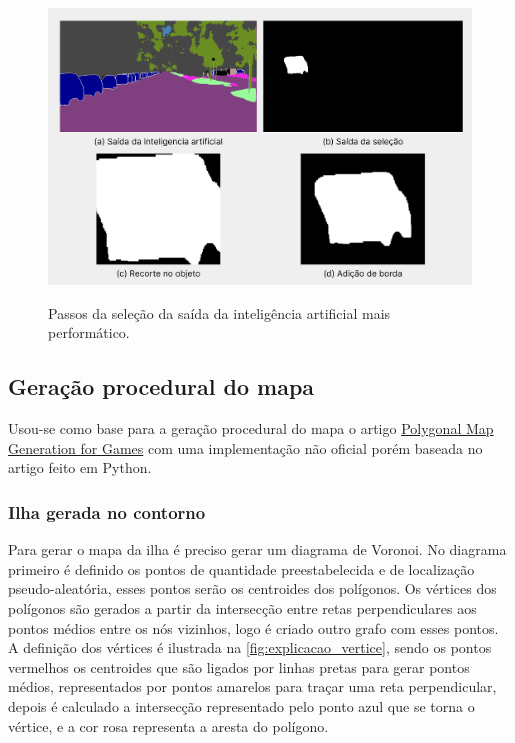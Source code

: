 \begin{figure}[!ht]
	\centering
    \caption{Passos da seleção da saída da inteligência  artificial mais performático.}
	\includegraphics[width=1.0\textwidth]{figures/saidas_selecao_2.png}
	\label{fig:saidas_selecao_perf}
\end{figure}

\subsection{Geração procedural do mapa}

Usou-se como base para a geração procedural do mapa o artigo \hyperref[sec:geracaoProcedural]{Polygonal Map Generation for Games} com uma implementação não oficial porém baseada no artigo feito em Python.

\subsubsection{Ilha gerada no contorno}

Para gerar o mapa da ilha é preciso gerar um diagrama de Voronoi. No diagrama primeiro é definido os pontos de quantidade preestabelecida e de localização pseudo-aleatória, esses pontos serão os centroides dos polígonos. Os vértices dos polígonos são gerados a partir da intersecção entre retas perpendiculares aos pontos médios entre os nós vizinhos, logo é criado outro grafo com esses pontos. A definição dos vértices é ilustrada na \cref{fig:explicacao_vertice}, sendo os pontos vermelhos os centroides que são ligados por linhas pretas para gerar pontos médios, representados por pontos amarelos para traçar uma reta perpendicular, depois é calculado a intersecção representado pelo ponto azul que se torna o vértice, e a cor rosa representa a aresta do polígono.

